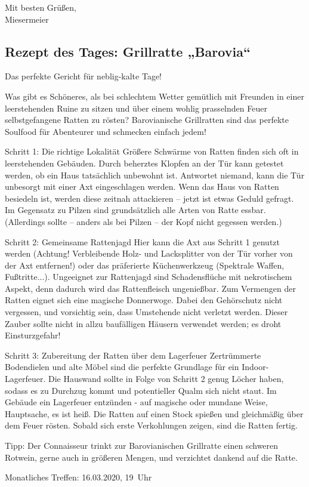 \noindent
Mit besten Grüßen, \\
Miesermeier


\subsection{Rezept des Tages: Grillratte „Barovia“}

Das perfekte Gericht für neblig-kalte Tage!

Was gibt es Schöneres, als bei schlechtem Wetter gemütlich mit Freunden in einer leerstehenden Ruine zu sitzen und über einem wohlig prasselnden Feuer selbstgefangene Ratten zu rösten? Barovianische Grillratten sind das perfekte Soulfood für Abenteurer und schmecken einfach jedem!

Schritt 1: Die richtige Lokalität
Größere Schwärme von Ratten finden sich oft in leerstehenden Gebäuden. Durch beherztes Klopfen an der Tür kann getestet werden, ob ein Haus tatsächlich unbewohnt ist. Antwortet niemand, kann die Tür unbesorgt mit einer Axt eingeschlagen werden. Wenn das Haus von Ratten besiedeln ist, werden diese zeitnah attackieren – jetzt ist etwas Geduld gefragt.
Im Gegensatz zu Pilzen sind grundsätzlich alle Arten von Ratte essbar. (Allerdings sollte – anders als bei Pilzen – der Kopf nicht gegessen werden.)

Schritt 2: Gemeinsame Rattenjagd
Hier kann die Axt aus Schritt 1 genutzt werden (Achtung! Verbleibende Holz- und Lacksplitter von der Tür vorher von der Axt entfernen!) oder das präferierte Küchenwerkzeug (Spektrale Waffen, Fußtritte...). Ungeeignet zur Rattenjagd sind Schadensflüche mit nekrotischem Aspekt, denn dadurch wird das Rattenfleisch ungenießbar.
Zum Vermengen der Ratten eignet sich eine magische Donnerwoge. Dabei den Gehörschutz nicht vergessen, und vorsichtig sein, dass Umstehende nicht verletzt werden. Dieser Zauber sollte nicht in allzu baufälligen Häusern verwendet werden; es droht Einsturzgefahr!

Schritt 3: Zubereitung der Ratten über dem Lagerfeuer
Zertrümmerte Bodendielen und alte Möbel sind die perfekte Grundlage für ein Indoor-Lagerfeuer. Die Hauswand sollte in Folge von Schritt 2 genug Löcher haben, sodass es zu Durchzug kommt und potentieller Qualm sich nicht staut. Im Gebäude ein Lagerfeuer entzünden - auf magische oder mundane Weise, Hauptsache, es ist heiß. Die Ratten auf einen Stock spießen und gleichmäßig über dem Feuer rösten. Sobald sich erste Verkohlungen zeigen, sind die Ratten fertig.

Tipp: Der Connaisseur trinkt zur Barovianischen Grillratte einen schweren Rotwein, gerne auch in größeren Mengen, und verzichtet dankend auf die Ratte.



\begin{termine}
  \item Monatliches Treffen: 16.03.2020, 19~Uhr
\end{termine}
\impressum


